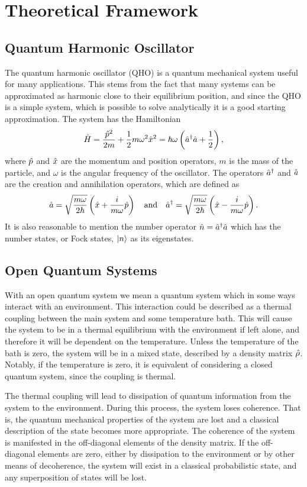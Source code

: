 \section{Theoretical Framework}
\subsection{Quantum Harmonic Oscillator}
The quantum harmonic oscillator (QHO) is a quantum mechanical system useful for many applications. This stems from the fact that many systems can be approximated as harmonic close to their equilibrium position, and since the QHO is a simple system, which is possible to solve analytically it is a good starting approximation. The system has the Hamiltonian
\begin{equation}
    \hat{H} = \frac{\hat{p}^2}{2m} + \frac{1}{2}m\omega^2\hat{x}^2 = \hbar\omega\left(\hat{a}^{\dagger}\hat{a} + \frac{1}{2}\right),
\end{equation}
where $\hat{p}$ and $\hat{x}$ are the momentum and position operators, $m$ is the mass of the particle, and $\omega$ is the angular frequency of the oscillator. The operators $\hat{a}^{\dagger}$ and $\hat{a}$ are the creation and annihilation operators, which are defined as
\begin{equation}
    \hat{a} = \sqrt{\frac{m\omega}{2\hbar}} \left(\hat{x} + \frac{i}{m\omega} \hat{p}\right) \quad \text{and} \quad \hat{a}^{\dagger} = \sqrt{\frac{m\omega}{2\hbar}} \left(\hat{x} - \frac{i}{m\omega} \hat{p}\right).
\end{equation}
It is also reasonable to mention the number operator $\hat{n} = \hat{a}^{\dagger}\hat{a}$ which has the number states, or Fock states, $\ket{n}$ as its eigenstates.

\subsection{Open Quantum Systems}
With an open quantum system we mean a quantum system which in some ways interact with an environment. This interaction could be described as a thermal coupling between the main system and some temperature bath. This will cause the system to be in a thermal equilibrium with the environment if left alone, and therefore it will be dependent on the temperature. Unless the temperature of the bath is zero, the system will be in a mixed state, described by a density matrix $\hat{\rho}$. Notably, if the temperature is zero, it is equivalent of considering a closed quantum system, since the coupling is thermal. \cite{Annby-Andersson:2024}

The thermal coupling will lead to dissipation of quantum information from the system to the environment. During this process, the system loses coherence. That is, the quantum mechanical properties of the system are lost and a classical description of the state becomes more appropriate. The coherence of the system is manifested in the off-diagonal elements of the density matrix. If the off-diagonal elements are zero, either by dissipation to the environment or by other means of decoherence, the system will exist in a classical probabilistic state, and any superposition of states will be lost. \cite{Annby-Andersson:2024}

